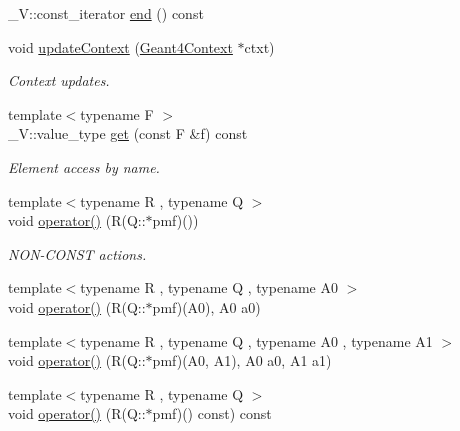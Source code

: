\begin{DoxyCompactItemize}
\item 
\_\-V::const\_\-iterator \hyperlink{class_d_d4hep_1_1_simulation_1_1_geant4_action_1_1_actors_ad612f86da710cf1ab66e2d381a4ec75f}{end} () const 
\item 
void \hyperlink{class_d_d4hep_1_1_simulation_1_1_geant4_action_1_1_actors_aadb2c770ac471bc278d2fc9a1cc719d3}{updateContext} (\hyperlink{class_d_d4hep_1_1_simulation_1_1_geant4_context}{Geant4Context} $\ast$ctxt)
\begin{DoxyCompactList}\small\item\em Context updates. \item\end{DoxyCompactList}\item 
{\footnotesize template$<$typename F $>$ }\\\_\-V::value\_\-type \hyperlink{class_d_d4hep_1_1_simulation_1_1_geant4_action_1_1_actors_a1aa919d30933f36bdac3cc527f7ea5e5}{get} (const F \&f) const 
\begin{DoxyCompactList}\small\item\em Element access by name. \item\end{DoxyCompactList}\item 
{\footnotesize template$<$typename R , typename Q $>$ }\\void \hyperlink{class_d_d4hep_1_1_simulation_1_1_geant4_action_1_1_actors_a7f3d71a8b04e5f6068496a7ebbc25837}{operator()} (R(Q::$\ast$pmf)())
\begin{DoxyCompactList}\small\item\em NON-\/CONST actions. \item\end{DoxyCompactList}\item 
{\footnotesize template$<$typename R , typename Q , typename A0 $>$ }\\void \hyperlink{class_d_d4hep_1_1_simulation_1_1_geant4_action_1_1_actors_a61fa5e9370c05c3c2426d9ec54c0026b}{operator()} (R(Q::$\ast$pmf)(A0), A0 a0)
\item 
{\footnotesize template$<$typename R , typename Q , typename A0 , typename A1 $>$ }\\void \hyperlink{class_d_d4hep_1_1_simulation_1_1_geant4_action_1_1_actors_adda539c63130d35cbb7348c715770bb6}{operator()} (R(Q::$\ast$pmf)(A0, A1), A0 a0, A1 a1)
\item 
{\footnotesize template$<$typename R , typename Q $>$ }\\void \hyperlink{class_d_d4hep_1_1_simulation_1_1_geant4_action_1_1_actors_ae2a3a67ccb7be19f771a7f88603b6258}{operator()} (R(Q::$\ast$pmf)() const) const 

\end{DoxyCompactItemize}
